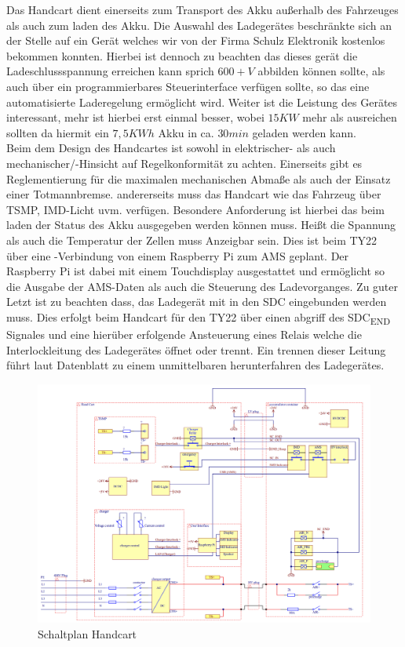 Das Handcart dient einerseits zum Transport des Akku außerhalb des Fahrzeuges als auch zum laden des Akku. Die Auswahl des Ladegerätes beschränkte sich an der Stelle auf ein Gerät welches wir von der Firma Schulz Elektronik kostenlos bekommen konnten. Hierbei ist dennoch zu beachten das dieses gerät die Ladeschlussspannung erreichen kann sprich \ensuremath{600+ V} abbilden können sollte, als auch über ein programmierbares Steuerinterface verfügen sollte, so das eine automatisierte Laderegelung ermöglicht wird. Weiter ist die Leistung des Gerätes interessant, mehr ist hierbei erst einmal besser, wobei \ensuremath{15 KW} mehr als ausreichen sollten da hiermit ein \ensuremath{7,5 KWh} Akku in ca. \ensuremath{30 min} geladen werden kann.\\
Beim dem Design des Handcartes ist sowohl in elektrischer- als auch mechanischer/-Hinsicht auf Regelkonformität zu achten. Einerseits gibt es Reglementierung für die maximalen mechanischen Abmaße als auch der Einsatz einer Totmannbremse. andererseits muss das Handcart wie das Fahrzeug über \ac{TSMP}, \ac{IMD}-Licht uvm. verfügen. Besondere Anforderung ist hierbei das beim laden der Status des Akku ausgegeben werden können muss. Heißt die Spannung als auch die Temperatur der Zellen muss Anzeigbar sein. Dies ist beim TY22 über eine -Verbindung von einem Raspberry Pi zum \ac{AMS} geplant. Der Raspberry Pi ist dabei mit einem Touchdisplay ausgestattet und ermöglicht so die Ausgabe der \ac{AMS}-Daten als auch die Steuerung des Ladevorganges. Zu guter Letzt ist zu beachten dass, das Ladegerät mit in den \ac{SDC} eingebunden werden muss. Dies erfolgt beim Handcart für den TY22 über einen abgriff des \ac{SDC}\textsubscript{END} Signales und eine hierüber erfolgende Ansteuerung eines Relais welche die Interlockleitung des Ladegerätes öffnet oder trennt. Ein trennen dieser Leitung führt laut Datenblatt zu einem unmittelbaren herunterfahren des Ladegerätes.

\begin{figure}
	\centering
	\includegraphics[width=1\linewidth]{Bilder/Charger Schematic.PNG}
	\caption{Schaltplan Handcart}
	\label{fig:chargerschematicv3}
\end{figure}

\FloatBarrier
